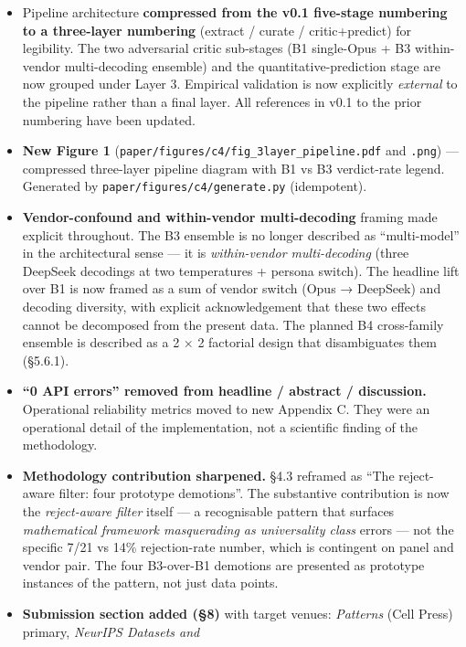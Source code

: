 \documentclass[
  letterpaper,
  11pt]{article}
\providecommand{\tightlist}{%
  \setlength{\itemsep}{0pt}\setlength{\parskip}{0pt}}
\begin{document}
\begin{itemize}
\tightlist
\item
  Pipeline architecture \textbf{compressed from the v0.1 five-stage
  numbering to a three-layer numbering} (extract / curate /
  critic+predict) for legibility. The two adversarial critic sub-stages
  (B1 single-Opus + B3 within-vendor multi-decoding ensemble) and the
  quantitative-prediction stage are now grouped under Layer 3. Empirical
  validation is now explicitly \emph{external} to the pipeline rather
  than a final layer. All references in v0.1 to the prior numbering have
  been updated.
\item
  \textbf{New Figure 1}
  (\texttt{paper/figures/c4/fig\_3layer\_pipeline.pdf} and
  \texttt{.png}) --- compressed three-layer pipeline diagram with B1 vs
  B3 verdict-rate legend. Generated by
  \texttt{paper/figures/c4/generate.py} (idempotent).
\item
  \textbf{Vendor-confound and within-vendor multi-decoding} framing made
  explicit throughout. The B3 ensemble is no longer described as
  ``multi-model'' in the architectural sense --- it is
  \emph{within-vendor multi-decoding} (three DeepSeek decodings at two
  temperatures + persona switch). The headline lift over B1 is now
  framed as a sum of vendor switch (Opus → DeepSeek) and decoding
  diversity, with explicit acknowledgement that these two effects cannot
  be decomposed from the present data. The planned B4 cross-family
  ensemble is described as a 2 × 2 factorial design that disambiguates
  them (§5.6.1).
\item
  \textbf{``0 API errors'' removed from headline / abstract /
  discussion.} Operational reliability metrics moved to new Appendix C.
  They were an operational detail of the implementation, not a
  scientific finding of the methodology.
\item
  \textbf{Methodology contribution sharpened.} §4.3 reframed as ``The
  reject-aware filter: four prototype demotions''. The substantive
  contribution is now the \emph{reject-aware filter} itself --- a
  recognisable pattern that surfaces \emph{mathematical framework
  masquerading as universality class} errors --- not the specific 7/21
  vs 14\% rejection-rate number, which is contingent on panel and vendor
  pair. The four B3-over-B1 demotions are presented as prototype
  instances of the pattern, not just data points.
\item
  \textbf{Submission section added (§8)} with target venues:
  \emph{Patterns} (Cell Press) primary, \emph{NeurIPS Datasets and
}
\end{itemize}
\end{document}

